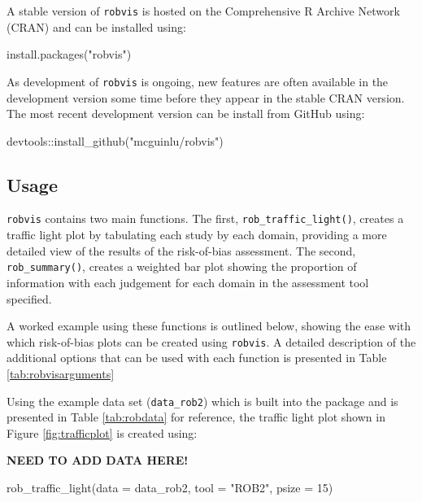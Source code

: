 \documentclass[a4paper, twoside]{templates/ociamthesis}
\newenvironment{Shaded}{\begin{snugshade}}{\end{snugshade}}
\newcommand{\AttributeTok}[1]{\textcolor[rgb]{0.77,0.63,0.00}{#1}}
\newcommand{\DecValTok}[1]{\textcolor[rgb]{0.00,0.00,0.81}{#1}}
\newcommand{\FunctionTok}[1]{\textcolor[rgb]{0.00,0.00,0.00}{#1}}
\newcommand{\NormalTok}[1]{#1}
\newcommand{\SpecialCharTok}[1]{\textcolor[rgb]{0.00,0.00,0.00}{#1}}
\newcommand{\StringTok}[1]{\textcolor[rgb]{0.31,0.60,0.02}{#1}}
\renewenvironment{Shaded}
{
  \vspace{4pt}%
  \begin{snugshade}%
}{%
  \end{snugshade}%
  \vspace{4pt}%
}
\begin{document}
A stable version of \texttt{robvis} is hosted on the Comprehensive R Archive Network (CRAN) and can be installed using:

\begin{Shaded}
\begin{Highlighting}[]
\FunctionTok{install.packages}\NormalTok{(}\StringTok{"robvis"}\NormalTok{)}
\end{Highlighting}
\end{Shaded}

As development of \texttt{robvis} is ongoing, new features are often available in the development version some time before they appear in the stable CRAN version. The most recent development version can be install from GitHub using:

\begin{Shaded}
\begin{Highlighting}[]
\NormalTok{devtools}\SpecialCharTok{::}\FunctionTok{install\_github}\NormalTok{(}\StringTok{"mcguinlu/robvis"}\NormalTok{)}
\end{Highlighting}
\end{Shaded}

\hypertarget{usage-1}{%
\subsection{Usage}\label{usage-1}}

\texttt{robvis} contains two main functions. The first, \texttt{rob\_traffic\_light()}, creates a traffic light plot by tabulating each study by each domain, providing a more detailed view of the results of the risk-of-bias assessment. The second, \texttt{rob\_summary()}, creates a weighted bar plot showing the proportion of information with each judgement for each domain in the assessment tool specified.

A worked example using these functions is outlined below, showing the ease with which risk-of-bias plots can be created using \texttt{robvis}. A detailed description of the additional options that can be used with each function is presented in Table \ref{tab:robvisarguments}

Using the example data set (\texttt{data\_rob2}) which is built into the package and is presented in Table \ref{tab:robdata} for reference, the traffic light plot shown in Figure \ref{fig:trafficplot} is created using:

\textbf{NEED TO ADD DATA HERE!}

\begin{Shaded}
\begin{Highlighting}[]
\FunctionTok{rob\_traffic\_light}\NormalTok{(}\AttributeTok{data =}\NormalTok{ data\_rob2,}
                  \AttributeTok{tool =} \StringTok{"ROB2"}\NormalTok{,}
                  \AttributeTok{psize =} \DecValTok{15}\NormalTok{)}
\end{Highlighting}
\end{Shaded}
\end{document}
